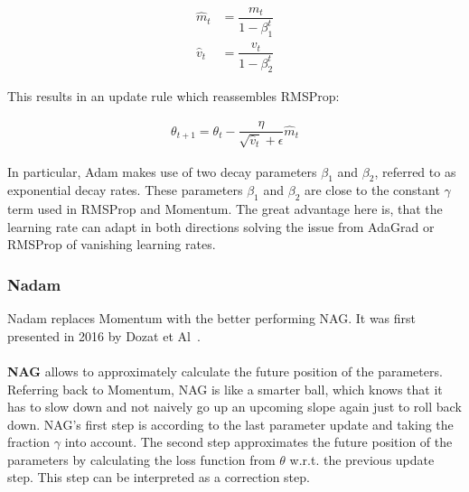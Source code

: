 \begin{align}
\hat{m}_t &= \dfrac{m_t}{1 - \beta^t_1} \label{eqn:adam:3}\\
\hat{v}_t &= \dfrac{v_t}{1 - \beta^t_2} \label{eqn:adam:4}
\end{align}

This results in an update rule which reassembles \gls{RMSProp}:

\begin{align}
    \theta_{t+1} = \theta_{t} - \dfrac{\eta}{\sqrt{\hat{v}_t} + \epsilon} \hat{m}_t \label{eqn:adam:5}
\end{align}

%

In particular, \gls{Adam} makes use of two decay parameters $\beta_1$ and $\beta_2$, referred to as exponential decay rates.
These parameters $\beta_1$ and $\beta_2$ are close to the constant $\gamma$ term used in \gls{RMSProp} and Momentum.
The great advantage here is, that the learning rate can adapt in both directions solving the issue from \gls{AdaGrad} or
\gls{RMSProp} of vanishing learning rates.

\subsubsection{\gls{Nadam}}
\gls{Nadam} replaces Momentum with the better performing \gls{NAG}.
It was first presented in 2016 by Dozat et Al~\cite{nadam}.
\\\mbox{}\\
\textbf{\gls{NAG}} allows to approximately calculate the future position of the parameters.
Referring back to Momentum, \gls{NAG} is like a smarter ball, which knows that it has to slow down and not naively go up an upcoming
slope again just to roll back down.
\gls{NAG}'s first step is according to the last parameter update and taking the fraction $\gamma$ into account.
The second step approximates the future position of the parameters by calculating the loss function from $\theta$ w.r.t.
the previous update step.
This step can be interpreted as a correction step.

